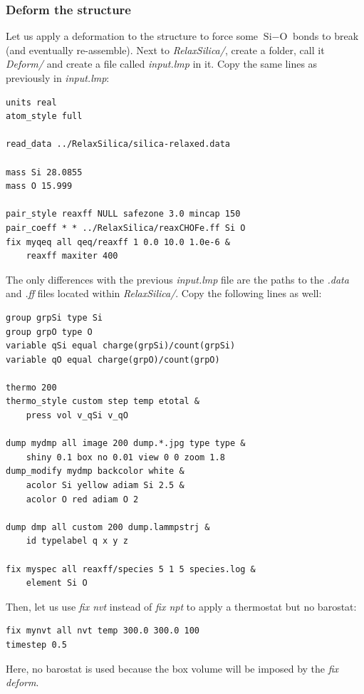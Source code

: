 \documentclass[9pt,tutorial]{livecoms}
\begin{document}
\subsubsection{Deform the structure}
Let us apply a deformation to the structure to force some $\text{Si}-\text{O}$
bonds to break (and eventually re-assemble). Next to \textit{RelaxSilica/},
create a folder, call it \textit{Deform/} and create a file called \textit{input.lmp}
in it. Copy the same lines as previously in \textit{input.lmp}:
\begin{lstlisting}
units real
atom_style full

read_data ../RelaxSilica/silica-relaxed.data

mass Si 28.0855
mass O 15.999

pair_style reaxff NULL safezone 3.0 mincap 150
pair_coeff * * ../RelaxSilica/reaxCHOFe.ff Si O
fix myqeq all qeq/reaxff 1 0.0 10.0 1.0e-6 &
    reaxff maxiter 400
\end{lstlisting}
The only differences with the previous \textit{input.lmp} file are the paths to
the \textit{.data} and \textit{.ff} files located within \textit{RelaxSilica/}.
Copy the following lines as well:
\begin{lstlisting}
group grpSi type Si
group grpO type O
variable qSi equal charge(grpSi)/count(grpSi)
variable qO equal charge(grpO)/count(grpO)

thermo 200
thermo_style custom step temp etotal &
    press vol v_qSi v_qO

dump mydmp all image 200 dump.*.jpg type type &
    shiny 0.1 box no 0.01 view 0 0 zoom 1.8
dump_modify mydmp backcolor white &
    acolor Si yellow adiam Si 2.5 &
    acolor O red adiam O 2

dump dmp all custom 200 dump.lammpstrj &
    id typelabel q x y z

fix myspec all reaxff/species 5 1 5 species.log &
    element Si O
\end{lstlisting}
Then, let us use \textit{fix nvt} instead of \textit{fix npt} to apply a
thermostat but no barostat:
\begin{lstlisting}
fix mynvt all nvt temp 300.0 300.0 100
timestep 0.5
\end{lstlisting}
Here, no barostat is used because the box volume will be imposed by the \textit{fix deform}.
\end{document}
